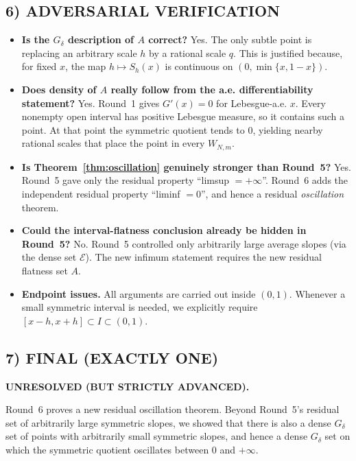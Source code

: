 \subsection{6) ADVERSARIAL VERIFICATION}

\begin{itemize}
\item \textbf{Is the $G_\delta$ description of $A$ correct?}
Yes. The only subtle point is replacing an arbitrary scale $h$ by a rational scale $q$. This is justified because, for fixed $x$, the map $h\mapsto S_h(x)$ is continuous on $(0,\min\{x,1-x\})$.

\item \textbf{Does density of $A$ really follow from the a.e. differentiability statement?}
Yes. Round~1 gives $G'(x)=0$ for Lebesgue-a.e. $x$. Every nonempty open interval has positive Lebesgue measure, so it contains such a point. At that point the symmetric quotient tends to $0$, yielding nearby rational scales that place the point in every $W_{N,m}$.

\item \textbf{Is Theorem~\ref{thm:oscillation} genuinely stronger than Round~5?}
Yes. Round~5 gave only the residual property ``limsup $=+\infty$''. Round~6 adds the independent residual property ``liminf $=0$'', and hence a residual \emph{oscillation} theorem.

\item \textbf{Could the interval-flatness conclusion already be hidden in Round~5?}
No. Round~5 controlled only arbitrarily large average slopes (via the dense set $\mathcal E$). The new infimum statement requires the new residual flatness set $A$.

\item \textbf{Endpoint issues.}
All arguments are carried out inside $(0,1)$. Whenever a small symmetric interval is needed, we explicitly require $[x-h,x+h]\subset I\subset(0,1)$.
\end{itemize}

\subsection{7) FINAL (EXACTLY ONE)}

\textbf{UNRESOLVED (BUT STRICTLY ADVANCED).}

Round~6 proves a new residual oscillation theorem. Beyond Round~5's residual set of arbitrarily large symmetric slopes, we showed that there is also a dense $G_\delta$ set of points with arbitrarily small symmetric slopes, and hence a dense $G_\delta$ set on which the symmetric quotient oscillates between $0$ and $+\infty$.


